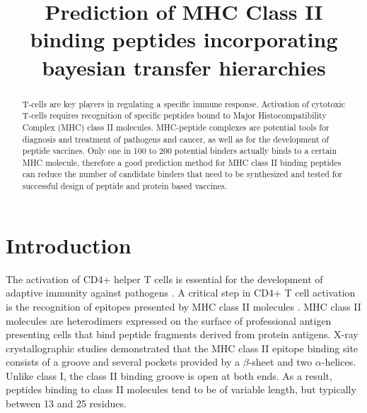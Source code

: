 \documentclass[conference,10pt,draftclsnofoot,onecolumn]{IEEEtran}
\begin{document}
%
\title{Prediction of MHC Class II binding peptides incorporating bayesian transfer hierarchies}

\author{
}

\maketitle

\begin{abstract}
T-cells are key players in regulating a specific immune response. Activation of
cytotoxic T-cells requires recognition of specific peptides bound to Major Histocompatibility
Complex (MHC) class II molecules. MHC-peptide complexes are potential tools for diagnosis and
treatment of pathogens and cancer, as well as for the development of peptide vaccines. Only one
in 100 to 200 potential binders actually binds to a certain MHC molecule, therefore a good
prediction method for MHC class II binding peptides can reduce the number of candidate binders
that need to be synthesized and tested for successful design of peptide and protein based vaccines.
\end{abstract}


\section{Introduction}
The activation of CD4+ helper T cells is essential for the development of adaptive immunity against pathogens \cite{jenkins01}. A
critical step in CD4+ T cell activation is the recognition of epitopes presented by MHC class II molecules \cite{rudolph06}. MHC class II molecules
are heterodimers expressed on the surface of professional antigen presenting cells that bind peptide fragments derived from protein
antigens. X-ray crystallographic studies demonstrated that the MHC class II epitope binding site consists of a groove and several
pockets provided by a $\beta$-sheet and two $\alpha$-helices. Unlike class I, the class II binding groove is open at both ends. As a result,
peptides binding to class II molecules tend to be of variable length, but typically between 13 and 25 residues.
\end{document}
